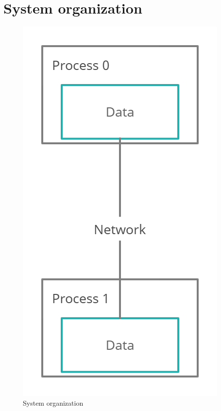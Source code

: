 \documentclass[times, 10pt]{thesisMDH}
\begin{document}
\section{System organization}
\begin{figure}[H]
    \centering
    \includegraphics[width = 0.3\linewidth]{images/3-2.png}
    \caption{System organization}
\end{figure}
\end{document}
